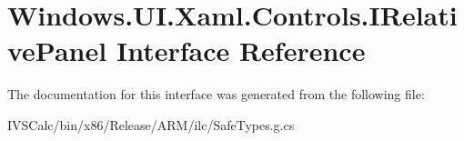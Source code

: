 \hypertarget{interface_windows_1_1_u_i_1_1_xaml_1_1_controls_1_1_i_relative_panel}{}\section{Windows.\+U\+I.\+Xaml.\+Controls.\+I\+Relative\+Panel Interface Reference}
\label{interface_windows_1_1_u_i_1_1_xaml_1_1_controls_1_1_i_relative_panel}


The documentation for this interface was generated from the following file\+:\begin{DoxyCompactItemize}
\item 
I\+V\+S\+Calc/bin/x86/\+Release/\+A\+R\+M/ilc/Safe\+Types.\+g.\+cs\end{DoxyCompactItemize}
